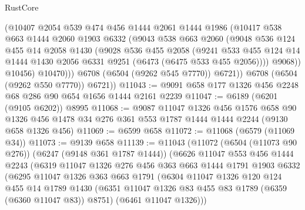 \begin{lexlean}{RustCore}
\begin{coremodule}
                (@10407
                  @2054
                  @539
                  @474
                  @456
                  @1444
                  @2061
                  @1444
                  @1986
                  (@10417
                    @538
                    @663
                    @1444
                    @2060
                    @1903
                    @6332
                    (@9043
                      @538
                      @663
                      @2060
                      (@9048
                        @536
                        @124
                        @455
                        @14
                        @2058
                        @1430
                        (@9028
                          @536
                          @455
                          @2058
                          (@9241
                            @533
                            @455
                            @124
                            @14
                            @1444
                            @1430
                            @2056
                            @6331
                            @9251
                            (@6473 (@6475 @533 @455 @2056))))
                        @9068))
                    @10456)
                  @10470)))
            @6708
            (@6504 (@9262 @545 @7770))
            @6721))
        @6708
        (@6504 (@9262 @550 @7770))
        @6721))
@11043 := @9091 @658 @177 @1326 @456 @2248 @68 @286 @90 @654 @1656 @1444 @2161 @2239
@11047 := @6189 (@6201 (@9105 @6202)) @8995
@11068 := @9087
    @11047
    @1326
    @456
    @1576
    @658
    @90
    @1326
    @456
    @1478
    @34
    @276
    @361
    @553
    @1787
    @1444
    @1444
    @2244
    (@9130 @658 @1326 @456)
@11069 := @6599 @658
@11072 := @11068 (@6579 (@11069 @34))
@11073 := @9139 @658
@11139 := @11043
    (@11072
      (@6504 (@11073 @90 @276))
      (@6247 (@9148 @361 @1787 @1444))
      (@6626
        @11047
        @553
        @456
        @1444
        @2243
        (@6319
          @11047
          @1326
          @276
          @456
          @363
          @663
          @1444
          @1791
          @1903
          @6332
          (@6295
            @11047
            @1326
            @363
            @663
            @1791
            (@6304
              @11047
              @1326
              @120
              @124
              @455
              @14
              @1789
              @1430
              (@6351 @11047 @1326 @83 @455 @83 @1789 (@6359 (@6360 @11047 @83)) @8751)
              (@6461 @11047 @1326)))

\end{coremodule}
\end{lexlean}
